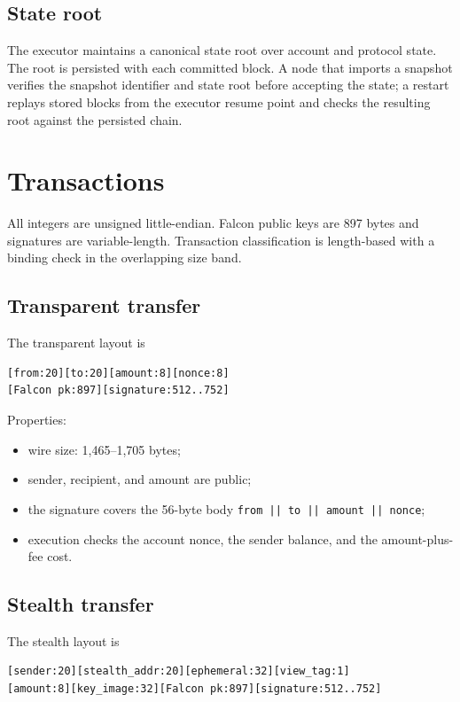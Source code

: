 \documentclass[11pt,a4paper]{article}
\begin{document}
\subsection{State root}

The executor maintains a canonical state root over account and protocol
state. The root is persisted with each committed block. A node that imports a
snapshot verifies the snapshot identifier and state root before accepting the
state; a restart replays stored blocks from the executor resume point and
checks the resulting root against the persisted chain.

\section{Transactions}
\label{sec:transactions}

All integers are unsigned little-endian. Falcon public keys are 897 bytes and
signatures are variable-length. Transaction classification is length-based
with a binding check in the overlapping size band.

\subsection{Transparent transfer}

The transparent layout is
\begin{verbatim}
[from:20][to:20][amount:8][nonce:8]
[Falcon pk:897][signature:512..752]
\end{verbatim}

Properties:
\begin{itemize}[leftmargin=*]
  \item wire size: 1,465--1,705 bytes;
  \item sender, recipient, and amount are public;
  \item the signature covers the 56-byte body
        \texttt{from || to || amount || nonce};
  \item execution checks the account nonce, the sender balance, and the
        amount-plus-fee cost.
\end{itemize}

\subsection{Stealth transfer}

The stealth layout is
\begin{verbatim}
[sender:20][stealth_addr:20][ephemeral:32][view_tag:1]
[amount:8][key_image:32][Falcon pk:897][signature:512..752]
\end{verbatim}
\end{document}
